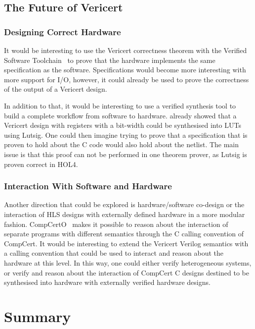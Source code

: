 \subsection{The Future of Vericert}

\subsubsection{Designing Correct Hardware}

It would be interesting to use the Vericert correctness theorem with the
Verified Software Toolchain~\cite{appel11_verif_softw_toolc} to prove that the
hardware implements the same specification as the software.  Specifications
would become more interesting with more support for I/O, however, it could
already be used to prove the correctness of the output of a Vericert design.

In addition to that, it would be interesting to use a verified synthesis tool to
build a complete workflow from software to hardware.  \textcite{lööw21_lutsig}
already showed that a Vericert design with registers with a bit-width could be
synthesised into \glspl{LUT} using Lutsig.  One could then imagine trying to
prove that a specification that is proven to hold about the C code would also
hold about the netlist.  The main issue is that this proof can not be performed
in one theorem prover, as Lutsig is proven correct in HOL4.

\subsubsection{Interaction With Software and Hardware}

Another direction that could be explored is hardware/software co-design or the
interaction of \gls{HLS} designs with externally defined hardware in a more
modular fashion.  CompCertO~\cite{koenig21_compc} makes it possible to reason
about the interaction of separate programs with different semantics through the
C calling convention of CompCert.  It would be interesting to extend the
Vericert Verilog semantics with a calling convention that could be used to
interact and reason about the hardware at this level.  In this way, one could
either verify heterogeneous systems, or verify and reason about the interaction
of CompCert C designs destined to be synthesised into hardware with externally
verified hardware designs.

\section{Summary}

